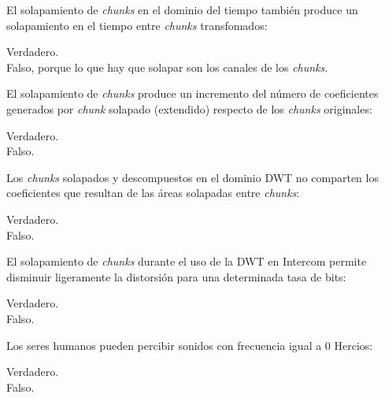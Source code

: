 \documentclass[legalpaper, 12pt, addpoints]{exam}
\begin{document}
\begin{questions}
\vspace{0.10in}

\question El solapamiento de \emph{chunks} en el dominio del tiempo
también produce un solapamiento en el tiempo entre \emph{chunks}
transfomados:

\begin{oneparchoices}
  \choice Verdadero.\\
  \choice Falso, porque lo que hay que solapar son los canales de los \emph{chunks}.
\end{oneparchoices}
  
\vspace{0.10in}

\question El solapamiento de \emph{chunks} produce un incremento del
número de coeficientes generados por \emph{chunk} solapado (extendido)
respecto de los \emph{chunks} originales:

\begin{oneparchoices}
  \choice Verdadero.\\
  \choice Falso.
\end{oneparchoices}
  
\vspace{0.10in}

\question Los \emph{chunks} solapados y descompuestos en el dominio
DWT no comparten los coeficientes que resultan de las áreas solapadas
entre \emph{chunks}:

\begin{oneparchoices}
  \choice Verdadero.\\
  \choice Falso.
\end{oneparchoices}
  
\vspace{0.10in}

\question El solapamiento de \emph{chunks} durante el uso de la DWT en
Intercom permite disminuir ligeramente la distorsión para una
determinada tasa de bits:

\begin{oneparchoices}
  \choice Verdadero.\\
  \choice Falso.
\end{oneparchoices}
  
\vspace{0.10in}

\question Los seres humanos pueden percibir sonidos con frecuencia
igual a 0 Hercios:

\begin{oneparchoices}
  \choice Verdadero.\\
  \choice Falso.
\end{oneparchoices}
  

\end{questions}
\end{document}
